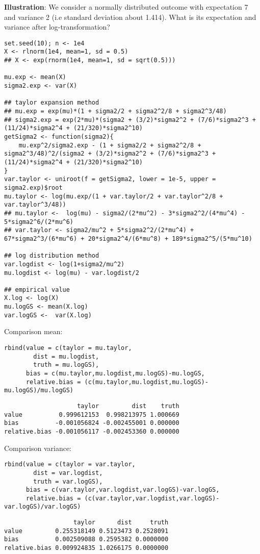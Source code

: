 \documentclass[12pt]{article}
\begin{document}
\textbf{Illustration}: We consider a normally distributed outcome with
expectation 7 and variance 2 (i.e standard deviation about
1.414). What is its expectation and variance after log-transformation?
\lstset{language=r,label= ,caption= ,captionpos=b,numbers=none}
\begin{lstlisting}
set.seed(10); n <- 1e4
X <- rlnorm(1e4, mean=1, sd = 0.5)
## X <- exp(rnorm(1e4, mean=1, sd = sqrt(0.5)))

mu.exp <- mean(X)
sigma2.exp <- var(X)

## taylor expansion method
## mu.exp = exp(mu)*(1 + sigma2/2 + sigma2^2/8 + sigma2^3/48)
## sigma2.exp = exp(2*mu)*(sigma2 + (3/2)*sigma2^2 + (7/6)*sigma2^3 + (11/24)*sigma2^4 + (21/320)*sigma2^10)
getSigma2 <- function(sigma2){
    mu.exp^2/sigma2.exp - (1 + sigma2/2 + sigma2^2/8 + sigma2^3/48)^2/(sigma2 + (3/2)*sigma2^2 + (7/6)*sigma2^3 + (11/24)*sigma2^4 + (21/320)*sigma2^10)
}
var.taylor <- uniroot(f = getSigma2, lower = 1e-5, upper = sigma2.exp)$root
mu.taylor <- log(mu.exp/(1 + var.taylor/2 + var.taylor^2/8 + var.taylor^3/48))
## mu.taylor <-  log(mu) - sigma2/(2*mu^2) - 3*sigma2^2/(4*mu^4) - 5*sigma2^6/(2*mu^6)
## var.taylor <- sigma2/mu^2 + 5*sigma2^2/(2*mu^4) + 67*sigma2^3/(6*mu^6) + 20*sigma2^4/(6*mu^8) + 189*sigma2^5/(5*mu^10)

## log distribution method
var.logdist <- log(1+sigma2/mu^2)
mu.logdist <- log(mu) - var.logdist/2 

## empirical value
X.log <- log(X)
mu.logGS <- mean(X.log)
var.logGS <-  var(X.log)
\end{lstlisting}

Comparison mean:
\lstset{language=r,label= ,caption= ,captionpos=b,numbers=none}
\begin{lstlisting}
rbind(value = c(taylor = mu.taylor, 
		dist = mu.logdist, 
		truth = mu.logGS),
      bias = c(mu.taylor,mu.logdist,mu.logGS)-mu.logGS,
      relative.bias = (c(mu.taylor,mu.logdist,mu.logGS)-mu.logGS)/mu.logGS)
\end{lstlisting}

\begin{verbatim}
                    taylor         dist    truth
value          0.999612153  0.998213975 1.000669
bias          -0.001056824 -0.002455001 0.000000
relative.bias -0.001056117 -0.002453360 0.000000
\end{verbatim}

Comparison variance:
\lstset{language=r,label= ,caption= ,captionpos=b,numbers=none}
\begin{lstlisting}
rbind(value = c(taylor = var.taylor, 
		dist = var.logdist, 
		truth = var.logGS),
      bias = c(var.taylor,var.logdist,var.logGS)-var.logGS,
      relative.bias = (c(var.taylor,var.logdist,var.logGS)-var.logGS)/var.logGS)
\end{lstlisting}

\begin{verbatim}
                   taylor      dist     truth
value         0.255318149 0.5123473 0.2528091
bias          0.002509088 0.2595382 0.0000000
relative.bias 0.009924835 1.0266175 0.0000000
\end{verbatim}

\clearpage
\end{document}
